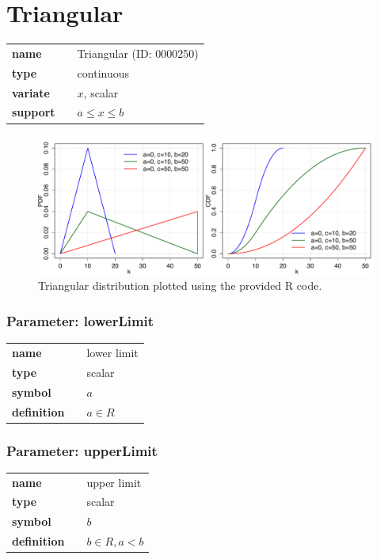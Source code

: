 \section*{Triangular} 

  \bigskip 

\begin{tabular}{p{2cm}cl}
\textbf{name} & & Triangular (ID: 0000250)\\ 
 
\textbf{type} & & continuous \\ 

\textbf{variate} & & $x$, scalar \\ 

\textbf{support} & & $a \leq x \leq b$
\end{tabular}

\begin{figure}[ht!]
\centering
  \includegraphics[width=140mm]{pics/Triangular.pdf}
 \caption{Triangular distribution plotted using the provided R code.}
 \label{fig:Triangular}
\end{figure}

\subsubsection*{Parameter: lowerLimit}

\noindent\begin{tabular}{p{2cm}cl}
\textbf{name} & & lower limit \\
\textbf{type} & & scalar \\
\textbf{symbol} & & $a$  \\
\textbf{definition} & & $a \in R$
\end{tabular}
\subsubsection*{Parameter: upperLimit}

\noindent\begin{tabular}{p{2cm}cl}
\textbf{name} & & upper limit \\
\textbf{type} & & scalar \\
\textbf{symbol} & & $b$  \\
\textbf{definition} & & $b \in R, a < b$
\end{tabular}
